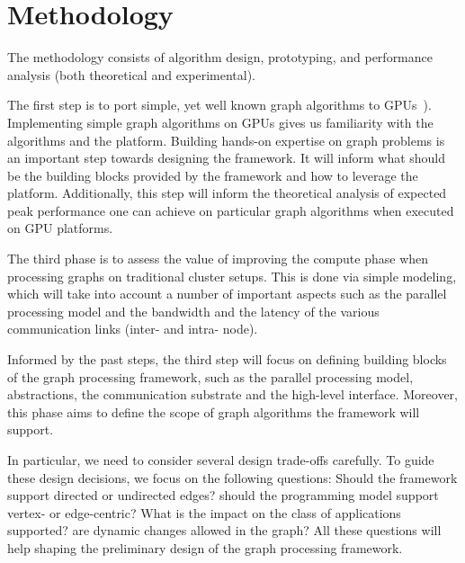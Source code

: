 \section{Methodology}
\label{sec:methodology}
The methodology consists of algorithm design, prototyping, and performance analysis (both theoretical and experimental).


The first step is to port simple, yet well known graph algorithms to GPUs~\cite{Quinn1984,Meyer2003,Harish2007,Malewicz2009,Sungpack2010}). Implementing simple graph algorithms on GPUs gives us familiarity with the algorithms and the platform. Building hands-on expertise on graph problems is an important step towards designing the framework. It will inform what should be the building blocks provided by the framework and how to leverage the platform. Additionally, this step will inform the theoretical analysis of expected peak performance one can achieve on particular graph algorithms when executed on GPU platforms.

The third phase is to assess the value of improving the compute phase when processing graphs on traditional cluster setups. This is done via simple modeling, which will take into account a number of important aspects such as the parallel processing model and the bandwidth and the latency of the various communication links (inter- and intra- node).

Informed by the past steps, the third step will focus on defining building blocks of the graph processing framework, such as the parallel processing model, abstractions, the communication substrate and the high-level interface. Moreover, this phase aims to define the scope of graph algorithms the framework will support. 

In particular, we need to consider several design trade-offs carefully. To guide these design decisions, we focus on the following questions: Should the framework support directed or undirected edges? should the programming model support vertex- or edge-centric? What is the impact on the class of applications supported? are dynamic changes allowed in the graph? All these questions will help shaping the preliminary design of the graph processing framework.
